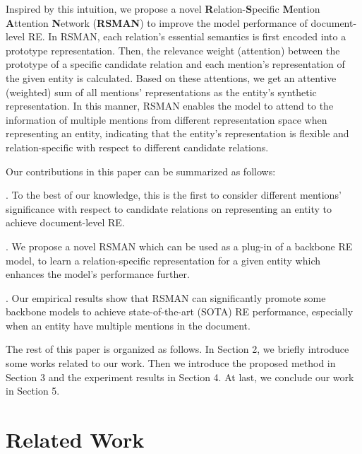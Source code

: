 \documentclass[11pt]{article}
\begin{document}
Inspired by this intuition, we propose a novel \textbf{R}elation-\textbf{S}pecific \textbf{M}ention \textbf{A}ttention \textbf{N}etwork (\textbf{RSMAN}) to improve the model performance of document-level RE. In RSMAN, each relation's essential semantics is first encoded into a prototype representation. Then, the relevance weight (attention) between the prototype of a specific candidate relation and each mention's representation of the given entity is calculated. Based on these attentions, we get an attentive (weighted) sum of all mentions' representations as the entity's synthetic representation. In this manner, RSMAN enables the model to attend to the information of multiple mentions from different representation space when representing an entity, indicating that the entity's representation is flexible and relation-specific with respect to different candidate relations.



Our contributions in this paper can be summarized as follows:

. To the best of our knowledge, this is the first to consider different mentions' significance with respect to candidate relations on representing an entity to achieve document-level RE.

. We propose a novel RSMAN which can be used as a plug-in of a backbone RE model, to learn a relation-specific representation for a given entity which enhances the model's performance further.

. Our empirical results show that RSMAN can significantly promote some backbone models to achieve state-of-the-art (SOTA) RE performance, especially when an entity have multiple mentions in the document.

The rest of this paper is organized as follows. In Section 2, we briefly introduce some works related to our work. Then we introduce the proposed method in Section 3 and the experiment results in Section 4. At last, we conclude our work in Section 5.

\section{Related Work}\label{sec:rw}
\end{document}
